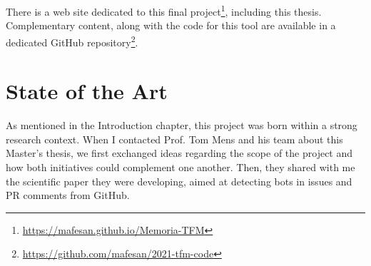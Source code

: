 \documentclass[a4paper, 12pt]{book}
\begin{document}
There is a web site dedicated to this final project\footnote{\url{https://mafesan.github.io/Memoria-TFM}}, including this thesis. Complementary content, along with the code for this tool are available in a dedicated GitHub repository\footnote{\url{https://github.com/mafesan/2021-tfm-code}}.



\cleardoublepage


\chapter{State of the Art}               %
\label{chap:state-art}

As mentioned in the Introduction chapter, this project was born within a strong research context. When I contacted Prof. Tom Mens and his team about this Master's thesis, we first exchanged ideas regarding the scope of the project and how both initiatives could complement one another. Then, they shared with me the scientific paper they were developing, aimed at detecting bots in issues and PR comments from GitHub.
\end{document}
